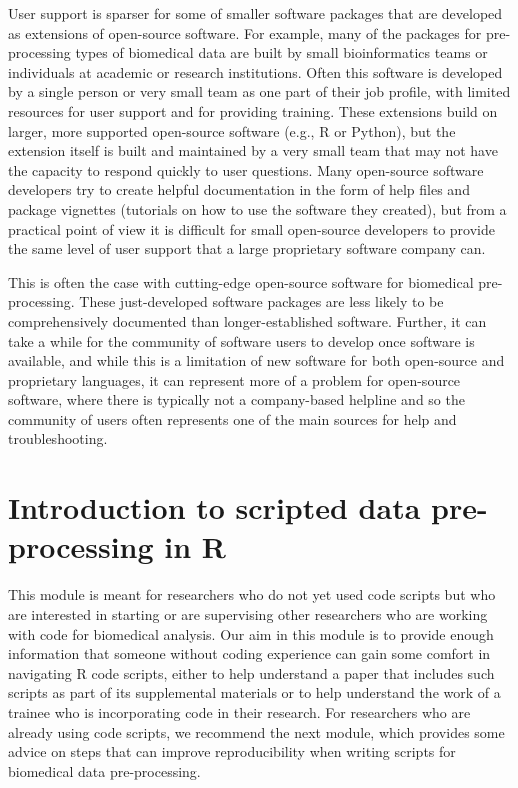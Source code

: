 \documentclass[]{tufte-book}
\begin{document}
User support is sparser for some of smaller software packages that are developed
as extensions of open-source software. For example, many of the packages for
pre-processing types of biomedical data are built by small bioinformatics teams
or individuals at academic or research institutions. Often this software is
developed by a single person or very small team as one part of their job
profile, with limited resources for user support and for providing training.
These extensions build on larger, more supported open-source software (e.g., R
or Python), but the extension itself is built and maintained by a very small
team that may not have the capacity to respond quickly to user questions. Many
open-source software developers try to create helpful documentation in the form
of help files and package vignettes (tutorials on how to use the software they
created), but from a practical point of view it is difficult for small
open-source developers to provide the same level of user support that a large
proprietary software company can.

This is often the case with cutting-edge open-source software for biomedical
pre-processing. These just-developed software packages are less likely to be
comprehensively documented than longer-established software. Further, it can
take a while for the community of software users to develop once software is
available, and while this is a limitation of new software for both open-source
and proprietary languages, it can represent more of a problem for open-source
software, where there is typically not a company-based helpline and so the
community of users often represents one of the main sources for help and
troubleshooting.

\section{Introduction to scripted data pre-processing in R}\label{module13}

This module is meant for researchers who do not yet used code scripts but who
are interested in starting or are supervising other researchers who are working
with code for biomedical analysis. Our aim in this module is to provide enough
information that someone without coding experience can gain some comfort in
navigating R code scripts, either to help understand a paper that includes such
scripts as part of its supplemental materials or to help understand the work of
a trainee who is incorporating code in their research. For researchers who are
already using code scripts, we recommend the next module, which provides some
advice on steps that can improve reproducibility when writing scripts for
biomedical data pre-processing.
\end{document}
